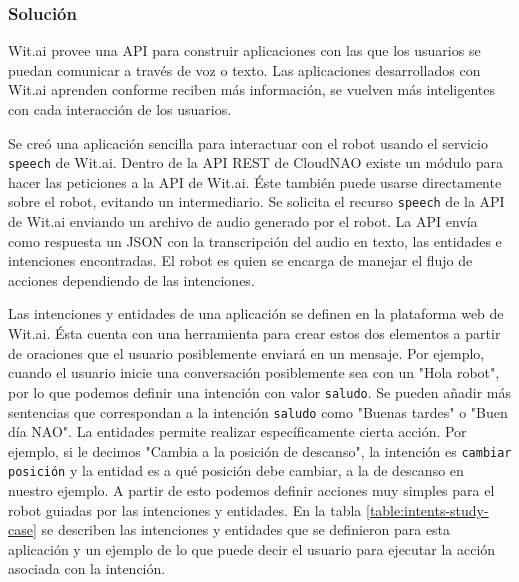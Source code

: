 \subsubsection{Solución}

Wit.ai provee una API para construir aplicaciones
con las que los usuarios se puedan comunicar a través de voz o texto.
Las aplicaciones desarrollados con Wit.ai aprenden conforme reciben más 
información, se vuelven más inteligentes con cada interacción de los usuarios.

Se creó una aplicación sencilla
para interactuar con el robot usando el servicio \texttt{speech} de
Wit.ai.
Dentro de la API REST de CloudNAO existe un módulo para hacer las peticiones
a la API de Wit.ai. Éste también puede usarse directamente sobre
el robot, evitando un intermediario.
Se solicita el recurso \texttt{speech} de la API de Wit.ai 
enviando
un archivo de audio generado por el robot. La API
envía como respuesta un JSON con la transcripción del audio 
en texto, las entidades e intenciones encontradas.
El robot es quien se encarga de manejar el flujo de
acciones dependiendo de las intenciones.

Las intenciones y entidades de una aplicación se definen en la plataforma
web de Wit.ai. Ésta cuenta con una herramienta para
crear estos dos elementos a partir de oraciones que el usuario
posiblemente enviará en un mensaje. Por ejemplo,
cuando el usuario inicie una conversación posiblemente
sea con un "Hola robot", por lo que podemos definir una
intención con valor \texttt{saludo}.
Se pueden añadir más sentencias
que correspondan a la intención \texttt{saludo}
como "Buenas tardes" o
"Buen día NAO".
La entidades permite realizar específicamente cierta acción.
Por ejemplo, si le decimos "Cambia a la posición de descanso", la intención es \texttt{cambiar posición} y la
entidad es a qué posición debe cambiar, a la de descanso
en nuestro ejemplo.
A partir de esto podemos definir acciones muy simples
para el robot guiadas por las intenciones y entidades. En la tabla \ref{table:intents-study-case} se describen las intenciones y entidades que se
definieron para esta aplicación
y un ejemplo de lo que puede decir el usuario para ejecutar la acción asociada con la intención.

